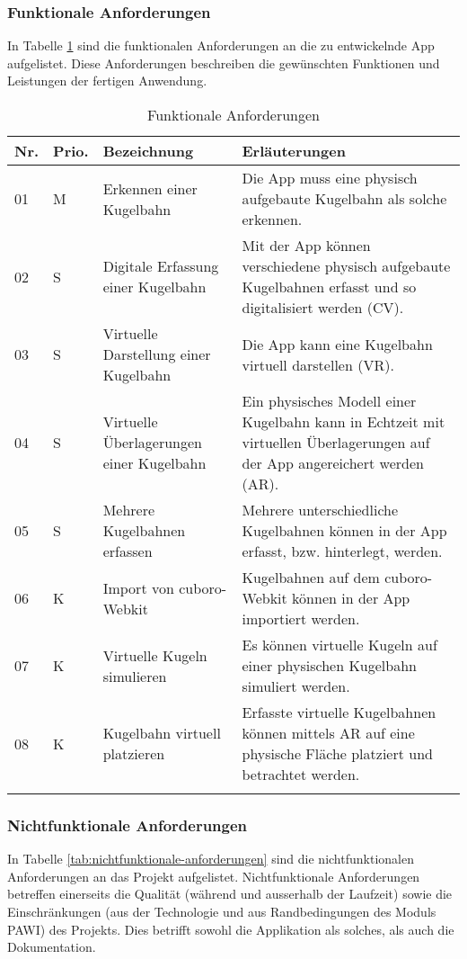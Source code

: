 \subsubsection{Funktionale Anforderungen}
In Tabelle \ref{tab:funktionale-anforderungen} sind die funktionalen Anforderungen an die zu entwickelnde App aufgelistet. Diese Anforderungen beschreiben die gewünschten Funktionen und Leistungen der fertigen Anwendung.

\begin{longtable}{l l p{4.7cm} p{8cm}}
	\hline
	\textbf{Nr.} & \textbf{Prio.} & \textbf{Bezeichnung} & \textbf{Erläuterungen} \\
	\hline
	01 & M & Erkennen einer Kugelbahn & Die App muss eine physisch aufgebaute Kugelbahn als solche erkennen. \\
	02 & S & Digitale Erfassung einer Kugelbahn & Mit der App können verschiedene physisch aufgebaute Kugelbahnen erfasst und so digitalisiert werden (CV). \\
	03 & S & Virtuelle Darstellung einer Kugelbahn & Die App kann eine Kugelbahn virtuell darstellen (VR). \\
	04 & S & Virtuelle Überlagerungen einer Kugelbahn & Ein physisches Modell einer Kugelbahn kann in Echtzeit mit virtuellen Überlagerungen auf der App angereichert werden (AR). \\
	05 & S & Mehrere Kugelbahnen erfassen & Mehrere unterschiedliche Kugelbahnen können in der App erfasst, bzw. hinterlegt, werden. \\
	06 & K & Import von cuboro-Webkit & Kugelbahnen auf dem cuboro-Webkit können in der App importiert werden. \\
	07 & K & Virtuelle Kugeln simulieren & Es können virtuelle Kugeln auf einer physischen Kugelbahn simuliert werden. \\
	08 & K & Kugelbahn virtuell platzieren & Erfasste virtuelle Kugelbahnen können mittels AR auf eine physische Fläche platziert und betrachtet werden. \\
	\hline
	\caption{Funktionale Anforderungen}
	\label{tab:funktionale-anforderungen}
\end{longtable}

\subsubsection{Nichtfunktionale Anforderungen}
In Tabelle \ref{tab:nichtfunktionale-anforderungen} sind die nichtfunktionalen Anforderungen an das Projekt aufgelistet. Nichtfunktionale Anforderungen betreffen einerseits die Qualität (während und ausserhalb der Laufzeit) sowie die Einschränkungen (aus der Technologie und aus Randbedingungen des Moduls PAWI) des Projekts. Dies betrifft sowohl die Applikation als solches, als auch die Dokumentation.

